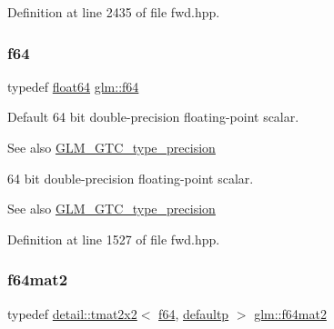 Definition at line 2435 of file fwd.\+hpp.

\mbox{\label{group__gtc__type__precision_ga2bba392e555124b36cde6abba349bab3}} 
\subsubsection{\texorpdfstring{f64}{f64}}
{\footnotesize\ttfamily typedef \hyperlink{group__gtc__type__precision_gab721f828b41f46b20cf4883b50733d3b}{float64} \hyperlink{group__gtc__type__precision_ga2bba392e555124b36cde6abba349bab3}{glm\+::f64}}

Default 64 bit double-\/precision floating-\/point scalar. \begin{DoxySeeAlso}{See also}
\hyperlink{group__gtc__type__precision}{G\+L\+M\+\_\+\+G\+T\+C\+\_\+type\+\_\+precision}
\end{DoxySeeAlso}
64 bit double-\/precision floating-\/point scalar. \begin{DoxySeeAlso}{See also}
\hyperlink{group__gtc__type__precision}{G\+L\+M\+\_\+\+G\+T\+C\+\_\+type\+\_\+precision} 
\end{DoxySeeAlso}


Definition at line 1527 of file fwd.\+hpp.

\mbox{\label{group__gtc__type__precision_gaa66040c1fd82a9d1f6ac82d4e1e8baa6}} 
\subsubsection{\texorpdfstring{f64mat2}{f64mat2}}
{\footnotesize\ttfamily typedef \hyperlink{structglm_1_1detail_1_1tmat2x2}{detail\+::tmat2x2}$<$ \hyperlink{group__gtc__type__precision_ga2bba392e555124b36cde6abba349bab3}{f64}, \hyperlink{namespaceglm_a0f04f086094c747d227af4425893f545a9d21ccd8b5a009ec7eb7677befc3bf51}{defaultp} $>$ \hyperlink{group__gtc__type__precision_gaa66040c1fd82a9d1f6ac82d4e1e8baa6}{glm\+::f64mat2}}

